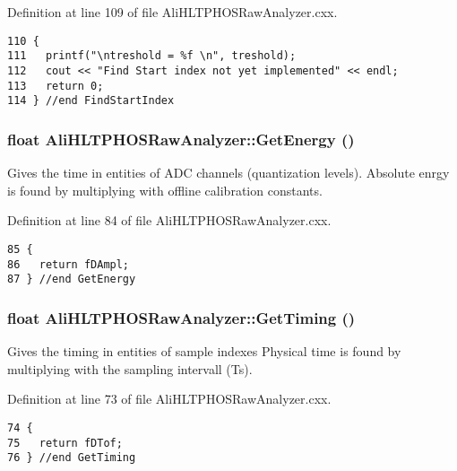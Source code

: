 Definition at line 109 of file Ali\-HLTPHOSRaw\-Analyzer.cxx.

\footnotesize\begin{verbatim}110 {
111   printf("\ntreshold = %f \n", treshold);
112   cout << "Find Start index not yet implemented" << endl;
113   return 0;
114 } //end FindStartIndex
\end{verbatim}\normalsize 


\subsubsection{\setlength{\rightskip}{0pt plus 5cm}float Ali\-HLTPHOSRaw\-Analyzer::Get\-Energy ()\hspace{0.3cm}{\tt  [inherited]}}\label{classAliHLTPHOSRawAnalyzer_AliHLTPHOSRawAnalyzerPeakFindera11}


Gives the time in entities of ADC channels (quantization levels). Absolute enrgy is found by multiplying with offline calibration constants. 

Definition at line 84 of file Ali\-HLTPHOSRaw\-Analyzer.cxx.

\footnotesize\begin{verbatim}85 {
86   return fDAmpl;
87 } //end GetEnergy
\end{verbatim}\normalsize 


\subsubsection{\setlength{\rightskip}{0pt plus 5cm}float Ali\-HLTPHOSRaw\-Analyzer::Get\-Timing ()\hspace{0.3cm}{\tt  [inherited]}}\label{classAliHLTPHOSRawAnalyzer_AliHLTPHOSRawAnalyzerPeakFindera10}


Gives the timing in entities of sample indexes Physical time is found by multiplying with the sampling intervall (Ts). 

Definition at line 73 of file Ali\-HLTPHOSRaw\-Analyzer.cxx.

\footnotesize\begin{verbatim}74 {
75   return fDTof;
76 } //end GetTiming
\end{verbatim}\normalsize 


